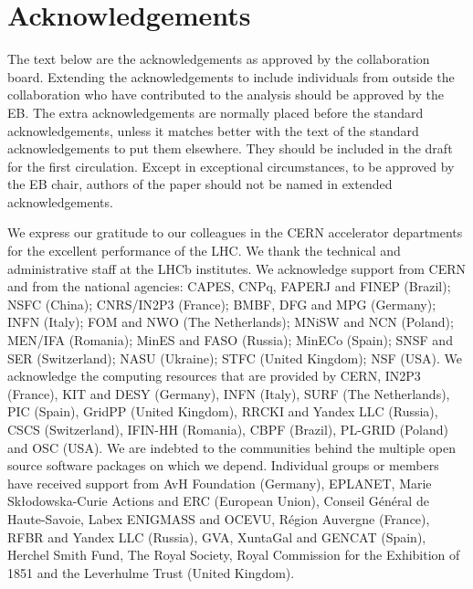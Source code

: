 \section*{Acknowledgements}

The text below are the acknowledgements as approved by the collaboration
board. Extending the acknowledgements to include individuals from outside the
collaboration who have contributed to the analysis should be approved by the
EB. The extra acknowledgements are normally placed before the standard 
acknowledgements, unless it matches better with the text of the standard 
acknowledgements to put them elsewhere. They should be included in the draft 
for the first circulation. Except in exceptional circumstances, to be approved by the
EB chair, authors of the paper should not be named in extended acknowledgements.
 
\noindent We express our gratitude to our colleagues in the CERN
accelerator departments for the excellent performance of the LHC. We
thank the technical and administrative staff at the LHCb
institutes. We acknowledge support from CERN and from the national
agencies: CAPES, CNPq, FAPERJ and FINEP (Brazil); NSFC (China);
CNRS/IN2P3 (France); BMBF, DFG and MPG (Germany); INFN (Italy); 
FOM and NWO (The Netherlands); MNiSW and NCN (Poland); MEN/IFA (Romania); 
MinES and FASO (Russia); MinECo (Spain); SNSF and SER (Switzerland); 
NASU (Ukraine); STFC (United Kingdom); NSF (USA).
We acknowledge the computing resources that are provided by CERN, IN2P3 (France), KIT and DESY (Germany), INFN (Italy), SURF (The Netherlands), PIC (Spain), GridPP (United Kingdom), RRCKI and Yandex LLC (Russia), CSCS (Switzerland), IFIN-HH (Romania), CBPF (Brazil), PL-GRID (Poland) and OSC (USA). We are indebted to the communities behind the multiple open 
source software packages on which we depend.
Individual groups or members have received support from AvH Foundation (Germany),
EPLANET, Marie Sk\l{}odowska-Curie Actions and ERC (European Union), 
Conseil G\'{e}n\'{e}ral de Haute-Savoie, Labex ENIGMASS and OCEVU, 
R\'{e}gion Auvergne (France), RFBR and Yandex LLC (Russia), GVA, XuntaGal and GENCAT (Spain), Herchel Smith Fund, The Royal Society, Royal Commission for the Exhibition of 1851 and the Leverhulme Trust (United Kingdom).
